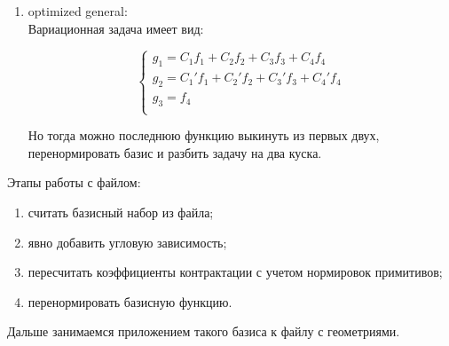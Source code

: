 \documentclass[a4paper,14pt]{extarticle}
\begin{document}
\begin{enumerate}
\item optimized general:\\
Вариационная задача имеет вид:

\begin{equation*}
\begin{cases}
g_1 = C_1f_1 + C_2f_2 + C_3f_3 + C_4f_4 \\
g_2 = C_1'f_1 + C_2'f_2 + C_3'f_3 + C_4'f_4 \\
g_3 = f_4 \\
\end{cases}
\end{equation*}

Но тогда можно последнюю функцию выкинуть из первых двух, перенормировать базис и разбить задачу на два куска.

\end{enumerate}

Этапы работы с файлом:

\begin{enumerate}
\item считать базисный набор из файла;
\item явно добавить угловую зависимость;
\item пересчитать коэффициенты контрактации с учетом нормировок примитивов;
\item перенормировать базисную функцию.
\end{enumerate}

Дальше занимаемся приложением такого базиса к файлу с геометриями.
\end{document}
